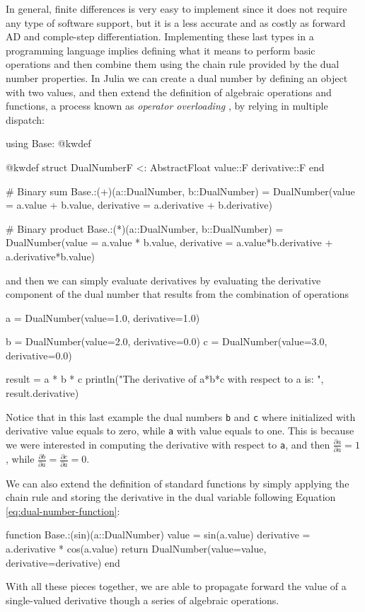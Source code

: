 In general, finite differences is very easy to implement since it does not require any type of software support, but it is a less accurate and as costly as forward AD \cite{Griewack-on-AD} and comple-step differentiation. 
Implementing these last types in a programming language implies defining what it means to perform basic operations and then combine them using the chain rule provided by the dual number properties.
In Julia we can create a dual number by defining an object with two values, and then extend the definition of algebraic operations and functions, a process known as \textit{operator overloading} \cite{Neuenhofen_2018}, by relying in multiple dispatch:
\begin{jllisting}
using Base: @kwdef

@kwdef struct DualNumber{F <: AbstractFloat}
    value::F
    derivative::F
end

# Binary sum
Base.:(+)(a::DualNumber, b::DualNumber) = DualNumber(value = a.value + b.value, derivative = a.derivative + b.derivative)

# Binary product 
Base.:(*)(a::DualNumber, b::DualNumber) = DualNumber(value = a.value * b.value, derivative = a.value*b.derivative + a.derivative*b.value)
\end{jllisting}
and then we can simply evaluate derivatives by evaluating the derivative component of the dual number that results from the combination of operations
\begin{jllisting}
a = DualNumber(value=1.0, derivative=1.0)

b = DualNumber(value=2.0, derivative=0.0)
c = DualNumber(value=3.0, derivative=0.0)

result = a * b * c
println("The derivative of a*b*c with respect to a is: ", result.derivative)
\end{jllisting}
Notice that in this last example the dual numbers \texttt{b} and \texttt{c} where initialized with derivative value equals to zero, while \texttt{a} with value equals to one. 
This is because we were interested in computing the derivative with respect to \texttt{a}, and then $\frac{\partial a}{\partial a} = 1$, while $\frac{\partial b}{\partial a} = \frac{\partial c}{\partial a} = 0$. 

We can also extend the definition of standard functions by simply applying the chain rule and storing the derivative in the dual variable following Equation \eqref{eq:dual-number-function}:
\begin{jllisting}
function Base.:(sin)(a::DualNumber)
    value = sin(a.value)
    derivative = a.derivative * cos(a.value)
    return DualNumber(value=value, derivative=derivative)
end
\end{jllisting}
With all these pieces together, we are able to propagate forward the value of a single-valued derivative though a series of algebraic operations. 

